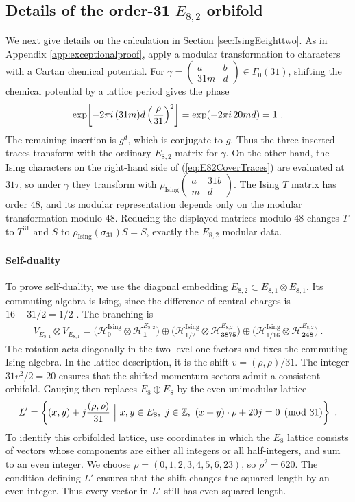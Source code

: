 \documentclass[12pt]{article}
\numberwithin{equation}{section}
\newcommand{\bea}{\begin{eqnarray}}
\newcommand{\eea}{\end{eqnarray}}
\def\ZZ{\mathbb{Z}}
\def\cH{\mathcal{H}}
\theoremstyle{remark}
\begin{document}
\subsection{Details of the order-31 $E_{8,2}$ orbifold}
\label{app:E82Lattice}

We next give details on the calculation in Section \ref{sec:IsingEeighttwo}. As in Appendix \ref{app:exceptionalproof}, apply a modular transformation to characters with a Cartan chemical potential. For $\gamma=\left(\begin{smallmatrix}a&b\\31m&d\end{smallmatrix}\right)\in\Gamma_0(31)$, shifting the chemical potential by a lattice period gives the phase
\bea
\exp\!\left[-2\pi i\,(31m)d\left({\rho\over31}\right)^2\right]=\exp(-2\pi i\,20md)=1~.
\eea
The remaining insertion is $g^d$, which is conjugate to $g$. Thus the three inserted traces transform with the ordinary $E_{8,2}$ matrix for $\gamma$. On the other hand, the Ising characters on the right-hand side of (\ref{eq:E82CoverTraces}) are evaluated at $31\tau$, so under $\gamma$ they transform with $\rho_{\mathrm{Ising}}\!\left(\begin{smallmatrix}a&31b\\m&d\end{smallmatrix}\right)$. The Ising $T$ matrix has order 48, and its modular representation depends only on the modular transformation modulo 48. Reducing the displayed matrices modulo 48 changes $T$ to $T^{31}$ and $S$ to $\rho_{\mathrm{Ising}}(\sigma_{31})S=S$, exactly the $E_{8,2}$ modular data.

\paragraph{Self-duality} To prove self-duality, we use the diagonal embedding $E_{8,2}\subset E_{8,1}\otimes E_{8,1}$. Its commuting algebra is Ising, since the difference of central charges is $16-31/2=1/2$ \cite{Goddard:1984vk}. The branching is \cite{Forgacs:1988iw}
\bea \label{eq:EeighttwoCompletion}
V_{E_{8,1}}\otimes V_{E_{8,1}}
=\bigl(\cH^{\mathrm{Ising}}_0\otimes\cH^{E_{8,2}}_{\mathbf1}\bigr)
\oplus\bigl(\cH^{\mathrm{Ising}}_{1/2}\otimes\cH^{E_{8,2}}_{\mathbf{3875}}\bigr)\oplus\bigl(\cH^{\mathrm{Ising}}_{1/16}\otimes\cH^{E_{8,2}}_{\mathbf{248}}\bigr)~.
\eea
The rotation acts diagonally in the two level-one factors and fixes the commuting Ising algebra. In the lattice description, it is the shift $v=(\rho,\rho)/31$. The integer $31v^2/2=20$ ensures that the shifted momentum sectors admit a consistent orbifold. Gauging then replaces $E_8\oplus E_8$ by the even unimodular lattice
\bea \label{eq:EeighttwoNeighbor}
L'=\left\{(x,y)+j{(\rho,\rho)\over31}\,\,\Big| \,\,x,y\in E_8,\ j\in\ZZ,\ (x+y)\cdot\rho+20j=0\pmod{31}\right\}~.
\eea
To identify this orbifolded lattice, use coordinates in which the $E_8$ lattice consists of vectors whose components are either all integers or all half-integers, and sum to an even integer. We choose $\rho=(0,1,2,3,4,5,6,23)$, so $\rho^2=620$. The condition defining $L'$ ensures that the shift changes the squared length by an even integer. Thus every vector in $L'$ still has even squared length.
\end{document}
